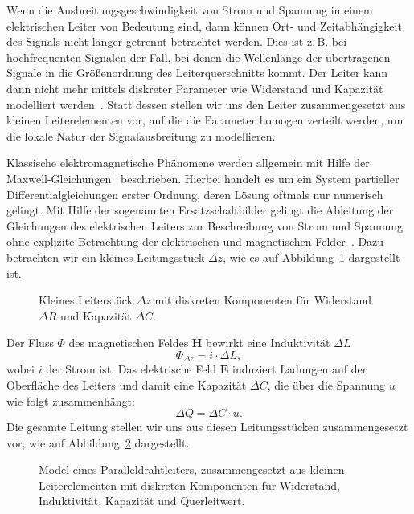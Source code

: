 \documentclass[paper=a4, parskip=half-, ngerman, fontsize=11pt]{scrreprt}
\begin{document}
Wenn die Ausbreitungsgeschwindigkeit von Strom und Spannung in einem elektrischen Leiter von Bedeutung sind, dann
können Ort- und Zeitabhängigkeit des Signals nicht länger getrennt betrachtet werden. Dies ist z.\,B. bei
hochfrequenten Signalen der Fall, bei denen die Wellenlänge der übertragenen Signale in die Größenordnung des
Leiterquerschnitts kommt. Der Leiter kann dann nicht mehr mittels diskreter Parameter wie Widerstand und Kapazität
modelliert werden~\cite{LeiterTheorie}. Statt dessen stellen wir uns den Leiter zusammengesetzt aus kleinen
Leiterelementen vor, auf die die Parameter homogen verteilt werden, um die lokale Natur der Signalausbreitung zu
modellieren.

Klassische elektromagnetische Phänomene werden allgemein mit Hilfe der Maxwell-Gleichungen~\cite{MaxwellGleichungen}
beschrieben. Hierbei handelt es um ein System partieller Differentialgleichungen erster Ordnung, deren Lösung oftmals
nur numerisch gelingt. Mit Hilfe der sogenannten Ersatzschaltbilder gelingt die Ableitung der Gleichungen des
elektrischen Leiters zur Beschreibung von Strom und Spannung ohne explizite Betrachtung der elektrischen und
magnetischen Felder~\cite{LeitungenUndFilter}. Dazu betrachten wir ein kleines Leitungsstück $\Delta z$, wie es auf
Abbildung~\ref{Leitung1} dargestellt ist.
\begin{figure}[!htb]
    \begin{center}
        
        \caption{Kleines Leiterstück $\Delta z$ mit diskreten Komponenten für Widerstand $\Delta R$ und
        Kapazität $\Delta C$.}
        \label{Leitung1}
    \end{center}
\end{figure}

Der Fluss $\Phi$ des magnetischen Feldes $\textbf{H}$ bewirkt eine Induktivität $\Delta L$
\[ \Phi_{\Delta z} = i \cdot \Delta L, \] wobei $i$ der Strom ist.
Das elektrische Feld $\textbf{E}$ induziert Ladungen auf der Oberfläche des Leiters und damit eine Kapazität $\Delta C$,
die über die Spannung $u$ wie folgt zusammenhängt:
\[ \Delta Q = \Delta C \cdot u . \]
Die gesamte Leitung stellen wir uns aus diesen Leitungsstücken zusammengesetzt vor, wie auf Abbildung~\ref{Leitung2}
dargestellt.
\begin{figure}[!htb]
    \begin{center}
        
        \caption{Model eines Paralleldrahtleiters, zusammengesetzt aus kleinen Leiterelementen mit diskreten
        Komponenten für Widerstand, Induktivität, Kapazität und Querleitwert.}
        \label{Leitung2}
    \end{center}
\end{figure}
\end{document}
